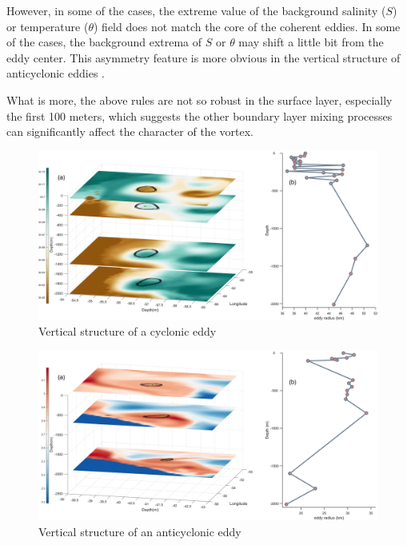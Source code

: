 However, in some of the cases, the extreme value of the background salinity ($S$) or temperature ($\theta$) field does not match the core of the coherent eddies. In some of the cases, the background extrema of $S$ or $\theta$ may shift a little bit from the eddy center. This asymmetry feature is more obvious in the vertical structure of anticyclonic eddies \cite{sandalyuk2021three}.

What is more, the above rules are not so robust in the surface layer, especially the first 100 meters, which suggests the other boundary layer mixing processes can significantly affect the character of the vortex.


\begin{figure}[htbp]
    \centering
    \includegraphics[width = 1\textwidth]{chapter/figure/cyclonic-3D.png}
    \caption{Vertical structure of a cyclonic eddy}
    \label{cyclonic-3D.png}
\end{figure}

\begin{figure}[htbp]
    \centering
    \includegraphics[width = 1\textwidth]{chapter/figure/2014-12-24_6.png}
    \caption{Vertical structure of an anticyclonic eddy}
    \label{2014-12-24_6.png}
\end{figure}

